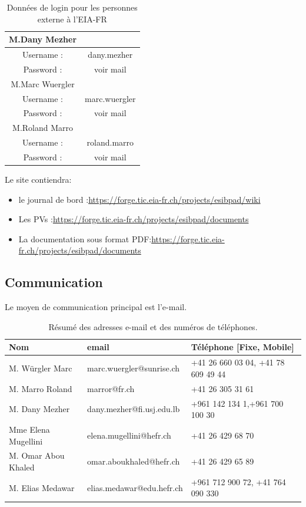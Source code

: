 		\begin{table}[H]
			\centering
			\begin{tabular}{|c|c|}
				\hline M.Dany Mezher &  \\ 
				\hline   Username : &  dany.mezher   \\ 
				\hline   Password : & voir mail     \\ [0.2cm]
				\hline M.Marc Wuergler & \\ 
				\hline   Username : &  marc.wuergler  \\ 
				\hline   Password : & voir mail \\ [0.2cm]
				\hline M.Roland Marro &  \\ 
				\hline   Username :&  roland.marro  \\ 
				\hline   Password : & voir mail     \\
				\hline
			\end{tabular} 
			\caption{\label{tab.login}Données de login pour les personnes externe à l'EIA-FR}
		\end{table}
	
		Le site contiendra:
	 	\begin{itemize}
	 		\item le journal de bord :\url{https://forge.tic.eia-fr.ch/projects/esibpad/wiki}
			\item Les PVs :\url{https://forge.tic.eia-fr.ch/projects/esibpad/documents} 
			\item La documentation sous format PDF:\url{https://forge.tic.eia-fr.ch/projects/esibpad/documents} 
		\end{itemize}
	\subsection{Communication}
		Le moyen de communication principal est l'e-mail.\\
		\begin{table}[H]
			\begin{tabular}{|l|l|l|}
				\hline  Nom & email  & Téléphone [Fixe, Mobile]  \\ 
				\hline M. Würgler Marc & marc.wuergler@sunrise.ch  & +41 26 660 03 04, +41 78 609 49 44  \\ 
				\hline M. Marro Roland & marror@fr.ch  & +41 26 305 31 61  \\ 
				\hline M. Dany Mezher	& dany.mezher@fi.usj.edu.lb & +961 142 134 1,+961 700 100 30  \\ 
				\hline Mme Elena Mugellini & elena.mugellini@hefr.ch &  +41 26 429 68 70\\ 
				\hline M. Omar Abou Khaled & omar.aboukhaled@hefr.ch  &  +41 26 429 65 89\\ 
				\hline M. Elias Medawar & elias.medawar@edu.hefr.ch  &  +961 712 900 72, +41 764 090 330\\ 
				\hline 
			\end{tabular} 
			\caption{Résumé des adresses e-mail et des numéros de téléphones.}			
		\end{table}
	
